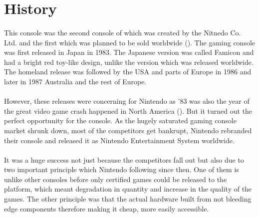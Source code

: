 \documentclass[]{report}
\begin{document}
\section{History}

\paragraph{ }
 This console was the second console of which was created by the Nitnedo Co. Ltd. and the first which was planned to be sold worldwide (\cite{HIST}).
The gaming console was first released in Japan in 1983. The Japanese version was called Famicon and had a bright red toy-like design, unlike the version which was released worldwide.
The homeland release was followed by the USA and parts of Europe in 1986 and later in 1987 Australia and the rest of Europe.
\paragraph{ }
However, these releases were concerning for Nintendo as '83 was also the year of the great video game crash happened in North America (\cite{CRSH}). But it turned out the perfect opportunity for the console. As the hugely saturated gaming console market shrunk down, most of the competitors get bankrupt, Nintendo rebranded their console and released it as Nintendo Entertainment System worldwide.
\paragraph{ }
 It was a huge success not just because the competitors fall out but also due to two important principle which Nintendo following since then. One of them is unlike other consoles before only certified games could be released to the platform, which meant degradation in quantity and increase in the quality of the games. The other principle was that the actual hardware built from not bleeding edge components therefore making it cheap, more easily accessible.
 
\end{document}
